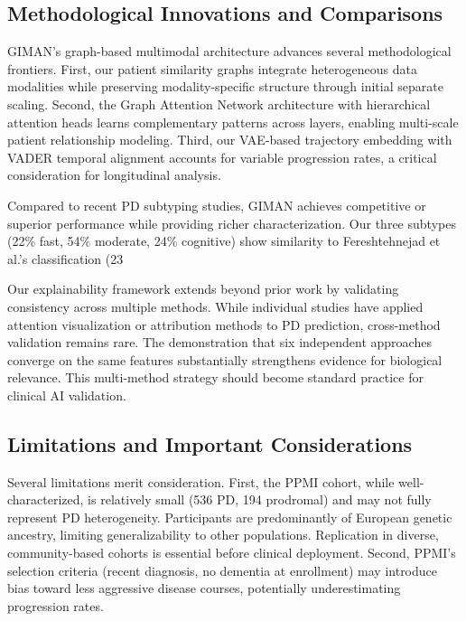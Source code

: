 \subsection{Methodological Innovations and Comparisons}

GIMAN's graph-based multimodal architecture advances several methodological frontiers. First, our patient similarity graphs integrate heterogeneous data modalities while preserving modality-specific structure through initial separate scaling. Second, the Graph Attention Network architecture with hierarchical attention heads learns complementary patterns across layers, enabling multi-scale patient relationship modeling. Third, our VAE-based trajectory embedding with VADER temporal alignment accounts for variable progression rates, a critical consideration for longitudinal analysis.

Compared to recent PD subtyping studies, GIMAN achieves competitive or superior performance while providing richer characterization. Our three subtypes (22\% fast, 54\% moderate, 24\% cognitive) show similarity to Fereshtehnejad et al.'s classification (23%

Our explainability framework extends beyond prior work by validating consistency across multiple methods. While individual studies have applied attention visualization or attribution methods to PD prediction, cross-method validation remains rare. The demonstration that six independent approaches converge on the same features substantially strengthens evidence for biological relevance. This multi-method strategy should become standard practice for clinical AI validation.

\subsection{Limitations and Important Considerations}

Several limitations merit consideration. First, the PPMI cohort, while well-characterized, is relatively small (536 PD, 194 prodromal) and may not fully represent PD heterogeneity. Participants are predominantly of European genetic ancestry, limiting generalizability to other populations. Replication in diverse, community-based cohorts is essential before clinical deployment. Second, PPMI's selection criteria (recent diagnosis, no dementia at enrollment) may introduce bias toward less aggressive disease courses, potentially underestimating progression rates.

